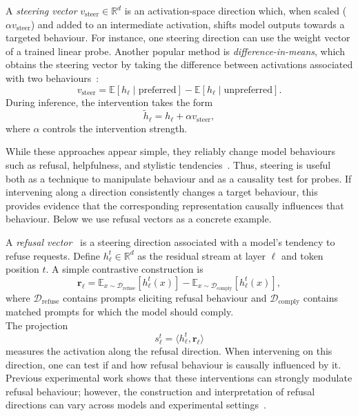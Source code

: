 \begin{definitionbox}
A \emph{steering vector} $v_{\text{steer}} \in \mathbb{R}^{d}$ is an activation-space direction which, when scaled ($\alpha v_{\text{steer}}$) and added to an intermediate activation, shifts model outputs towards a targeted behaviour. For instance, one steering direction can use the weight vector of a trained linear probe. Another popular method is \emph{difference-in-means}, which obtains the steering vector by taking the difference between activations associated with two behaviours~:
\[
v_{\text{steer}} =
\mathbb{E}[h_\ell \mid \text{preferred}]
-
\mathbb{E}[h_\ell \mid \text{unpreferred}].
\]
During inference, the intervention takes the form
\[
\tilde{h}_\ell = h_\ell + \alpha v_{\text{steer}},
\]
where $\alpha$ controls the intervention strength.
\end{definitionbox}

While these approaches appear simple, they reliably change model behaviours such as refusal, helpfulness, and stylistic tendencies~. Thus, steering is useful both as a technique to manipulate behaviour and as a causality test for probes. If intervening along a direction consistently changes a target behaviour, this provides evidence that the corresponding representation causally influences that behaviour. Below we use refusal vectors as a concrete example.

\begin{definitionbox}
\label{def:refusal-vector}



A \emph{refusal vector}~ is a steering direction associated with a model's tendency to refuse requests. 
Define $h^t_\ell \in \mathbb{R}^d$ as the residual stream at layer $\ell$ and token position $t$. A simple contrastive construction is
\[
\mathbf{r}_\ell =
\mathbb{E}_{x \sim \mathcal{D}_{\mathrm{refuse}}}
[h^t_\ell(x)]
-
\mathbb{E}_{x \sim \mathcal{D}_{\mathrm{comply}}}
[h^t_\ell(x)],
\]
where $\mathcal{D}_{\mathrm{refuse}}$ contains prompts eliciting refusal behaviour and $\mathcal{D}_{\mathrm{comply}}$ contains matched prompts for which the model should comply.\\

The projection
\[
s^t_\ell = \langle h^t_\ell,\mathbf{r}_\ell\rangle
\]
measures the activation along the refusal direction. When intervening on this direction, one can test if and how refusal behaviour is causally influenced by it. Previous experimental work shows that these interventions can strongly modulate refusal behaviour; however, the construction and interpretation of refusal directions can vary across models and experimental settings~.
\end{definitionbox}

